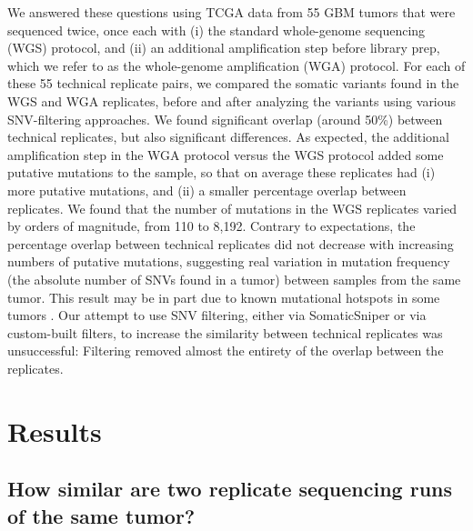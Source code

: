 \documentclass[11 pt]{article} %
\begin{document}
We answered these questions using TCGA data from 55 GBM tumors that were sequenced twice, once each with (i) the standard whole-genome sequencing (WGS) protocol, and (ii) an additional amplification step before library prep, which we refer to as the whole-genome amplification (WGA) protocol. For each of these 55 technical replicate pairs, we compared the somatic variants found in the WGS and WGA replicates, before and after analyzing the variants using various SNV-filtering approaches. We found significant overlap (around 50\%) between technical replicates, but also significant differences. As expected, the additional amplification step in the WGA protocol versus the WGS protocol added some putative mutations to the sample, so that on average these replicates had (i) more putative mutations, and (ii) a smaller percentage overlap between replicates. We found that the number of mutations in the WGS replicates varied by orders of magnitude, from 110 to 8,192. Contrary to expectations, the percentage overlap between technical replicates did not decrease with increasing numbers of putative mutations, suggesting real variation in mutation frequency (the absolute number of SNVs found in a tumor) between samples from the same tumor. This result may be in part due to known mutational hotspots in some tumors \citep{Karen}. Our attempt to use SNV filtering, either via SomaticSniper \citep{SomaticSniper} or via custom-built filters, to increase the similarity between technical replicates was unsuccessful: Filtering removed almost the entirety of the overlap between the replicates.

\section*{Results}

\subsection*{How similar are two replicate sequencing runs of the same tumor?}

\end{document}
